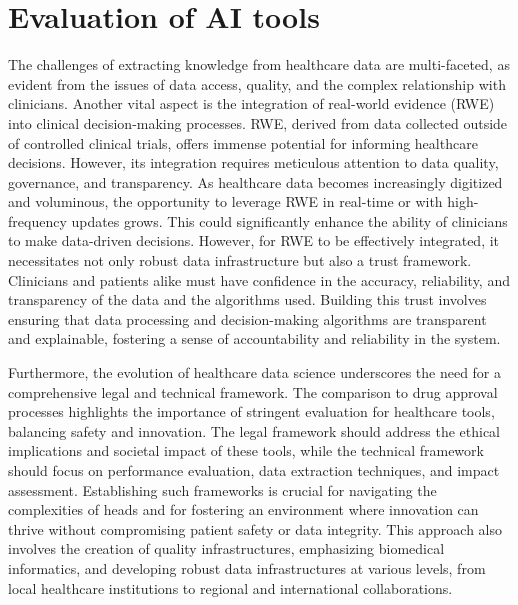 \section{Evaluation of AI tools}
The challenges of extracting knowledge from healthcare data are multi-faceted, as evident from the issues of data access, quality, and the complex relationship with clinicians. Another vital aspect is the integration of real-world evidence (RWE) into clinical decision-making processes. RWE, derived from data collected outside of controlled clinical trials, offers immense potential for informing healthcare decisions. However, its integration requires meticulous attention to data quality, governance, and transparency. As healthcare data becomes increasingly digitized and voluminous, the opportunity to leverage RWE in real-time or with high-frequency updates grows. This could significantly enhance the ability of clinicians to make data-driven decisions. However, for RWE to be effectively integrated, it necessitates not only robust data infrastructure but also a trust framework. Clinicians and patients alike must have confidence in the accuracy, reliability, and transparency of the data and the algorithms used. Building this trust involves ensuring that data processing and decision-making algorithms are transparent and explainable, fostering a sense of accountability and reliability in the system.

Furthermore, the evolution of healthcare data science underscores the need for a comprehensive legal and technical framework. The comparison to drug approval processes highlights the importance of stringent evaluation for healthcare tools, balancing safety and innovation. The legal framework should address the ethical implications and societal impact of these tools, while the technical framework should focus on performance evaluation, data extraction techniques, and impact assessment. Establishing such frameworks is crucial for navigating the complexities of \ac{heads} and for fostering an environment where innovation can thrive without compromising patient safety or data integrity. This approach also involves the creation of quality infrastructures, emphasizing biomedical informatics, and developing robust data infrastructures at various levels, from local healthcare institutions to regional and international collaborations.


